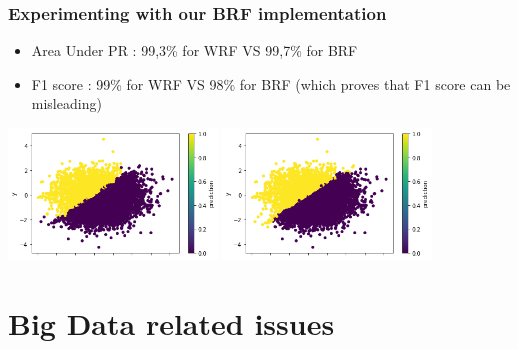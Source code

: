 \documentclass[slidestop,compress,red,mathserif]{beamer}
\begin{document}
\begin{frame}
\frametitle{Experimenting with our BRF implementation}
\begin{itemize}
  \item Area Under PR : 99,3\% for WRF VS 99,7\% for BRF
  \item F1 score : 99\% for WRF VS 98\% for BRF (which proves that F1 score can be misleading)

\end{itemize}

\centering
\includegraphics[height=3.5cm, keepaspectratio]{Figures/BRF.png}
\includegraphics[height=3.5cm, keepaspectratio]{Figures/WRF.png}

\end{frame}

\section{Big Data related issues}
\end{document}
